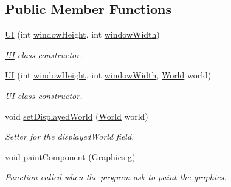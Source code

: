 \subsection*{Public Member Functions}
\begin{DoxyCompactItemize}
\item 
\hyperlink{a00034_ae48e53ac4da8caa19bfd6e1cff8b6262}{U\-I} (int \hyperlink{a00034_ad1a84d64616615d037c1ebca54647610}{window\-Height}, int \hyperlink{a00034_a4c35432cda424d024255606d4f95caf2}{window\-Width})
\begin{DoxyCompactList}\small\item\em \hyperlink{a00034}{U\-I} class constructor. \end{DoxyCompactList}\item 
\hyperlink{a00034_ad94ab572839f214ddf1879ec824b200f}{U\-I} (int \hyperlink{a00034_ad1a84d64616615d037c1ebca54647610}{window\-Height}, int \hyperlink{a00034_a4c35432cda424d024255606d4f95caf2}{window\-Width}, \hyperlink{a00039}{World} world)
\begin{DoxyCompactList}\small\item\em \hyperlink{a00034}{U\-I} class constructor. \end{DoxyCompactList}\item 
void \hyperlink{a00034_a766e5251d735ff629b5153f99416a9a8}{set\-Displayed\-World} (\hyperlink{a00039}{World} world)
\begin{DoxyCompactList}\small\item\em Setter for the displayed\-World field. \end{DoxyCompactList}\item 
void \hyperlink{a00034_a8cc928807d8b0aec6e3a5b9556748989}{paint\-Component} (Graphics g)
\begin{DoxyCompactList}\small\item\em Function called when the program ask to paint the graphics. \end{DoxyCompactList}\end{DoxyCompactItemize}
